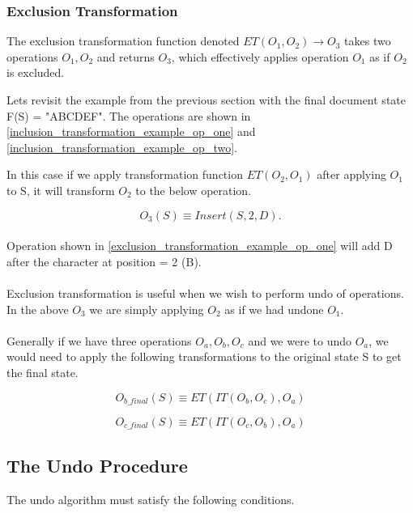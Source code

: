 \documentclass[12pt]{article}
\begin{document}
  \subsubsection{Exclusion Transformation}
  The exclusion transformation function denoted \(ET(O_{1}, O_{2}) \rightarrow O_{3}\) takes two operations
  \(O_{1}, O_{2}\) and returns \(O_{3}\), which effectively applies operation \(O_{1}\) as if \(O_{2}\) is excluded.

  Lets revisit the example from the previous section with the final  document state F(S) = "ABCDEF".
  The operations are shown in \ref{inclusion_transformation_example_op_one} and \ref{inclusion_transformation_example_op_two}.

  In this case if we apply transformation function \(ET(O_{2}, O_{1})\) after applying \(O_{1}\) to S,
  it will transform \(O_{2}\) to the below operation.

  \begin{equation} \label{exclusion_transformation_example_op_one}
    O_{3}(S) \equiv Insert(S, 2, D).
  \end{equation}\\
  Operation shown in \ref{exclusion_transformation_example_op_one} will add D after the character at position = 2 (B).
  \\ \\
  Exclusion transformation is useful when we wish to perform undo of operations.
  In the above \(O_{3}\) we are simply applying \(O_{2}\) as if we had undone \(O_{1}\).
  \\ \\
  Generally if we have three operations \(O_{a}, O_{b}, O_{c}\)
  and we were to undo \(O_{a}\), we would need to apply the following transformations to the original state S to get the final state.

  \begin{equation} \label{exclusion_transformation_example_op_two}
    O_{b\_final}(S) \equiv ET(IT(O_{b}, O_{c}), O_{a})
  \end{equation}

  \begin{equation} \label{exclusion_transformation_example_op_three}
    O_{c\_final}(S) \equiv ET(IT(O_{c}, O_{b}), O_{a})
  \end{equation}

  \subsection{The Undo Procedure}
  The undo algorithm must satisfy the following conditions.
\end{document}
